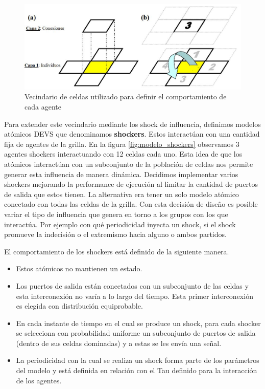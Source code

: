 \begin{figure}[!h]
\centering
\includegraphics[scale=0.5]{imagenes/modelo_pina.png}
\caption{Vecindario de celdas utilizado para definir el comportamiento de cada agente}
\label{fig:modelo_pina}
\end{figure}

Para extender este vecindario mediante los shock de influencia, definimos modelos atómicos DEVS\cite{DEVS} que denominamos \textbf{shockers}. Estos interactúan con una cantidad fija de agentes de la grilla. En la figura \ref{fig:modelo_shockers} observamos 3 agentes shockers interactuando con 12 celdas cada uno. Esta idea de que los atómicos interactúan con un subconjunto de la población de celdas nos permite generar esta influencia de manera dinámica. Decidimos implementar varios shockers mejorando la performance de ejecución al limitar la cantidad de puertos de salida que estos tienen. La alternativa era tener un solo modelo atómico conectado con todas las celdas de la grilla.  Con esta decisión de diseño es posible variar el tipo de influencia que genera en torno a los grupos con los que interactúa. Por ejemplo con qué periodicidad inyecta un shock, si el shock promueve la indecisión o el extremismo hacia alguno o ambos partidos.

El comportamiento de los shockers está definido de la siguiente manera.

\begin{itemize}
\item Estos atómicos no mantienen un estado.
\item Los puertos de salida están conectados con un subconjunto de las celdas y esta interconexión no varía a lo largo del tiempo. Esta primer interconexión es elegida con distribución equiprobable.
\item En cada instante de tiempo en el cual se produce un shock, para cada shocker se selecciona con probabilidad uniforme un subconjunto de puertos de salida (dentro de sus celdas dominadas) y a estas se les envía una señal.
\item La periodicidad con la cual se realiza un shock forma parte de los parámetros del modelo y está definida en relación con el Tau definido para la interacción de los agentes.
\end{itemize}

